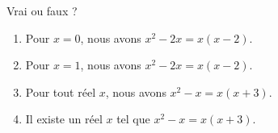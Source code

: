 
\begin{exercice}\label{exosmath-0255}

Vrai ou faux ?
\begin{multicols}{2}
    \begin{enumerate}
        \item
            Pour \( x=0\), nous avons \( x^2-2x=x(x-2)\). 
        \item
            Pour \( x=1\), nous avons \( x^2-2x=x(x-2)\). 
        \item
            Pour tout réel \( x\), nous avons \( x^2-x=x(x+3)\). 
        \item
            Il existe un réel \( x\) tel que \( x^2-x=x(x+3)\). 
    \end{enumerate}
\end{multicols}

\end{exercice}
